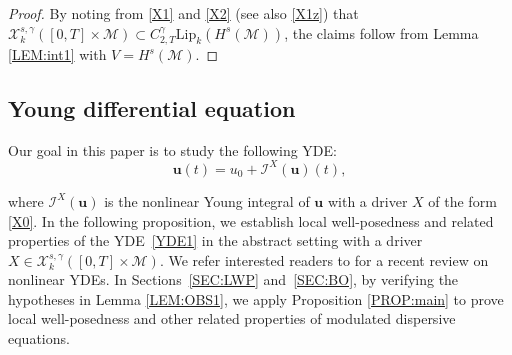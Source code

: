 \documentclass[letterpaper, 11pt,  reqno]{amsart}
\newcommand{\1}{\hspace{0.5mm}\text{I}\hspace{0.5mm}}
\newcommand{\I}{\mathcal{I}}
\newcommand{\noi}{\noindent}
\newcommand{\g}{\gamma}
\newcommand{\M}{\mathcal{M}}
\newcommand{\cX}{\mathcal{X}}
\newcommand{\Lip}{\mathrm{Lip}}
\newcommand{\uu}{\mathbf{u}}
\numberwithin{equation}{section}
\numberwithin{theorem}{section}
\begin{document}
\begin{proof}
 By noting from \eqref{X1} and \eqref{X2} 
 (see also \eqref{X1z}) that
$\cX^{s, \g}_k([0, T]\times \M) \subset  C^\g_{2, T}\Lip_k(H^s(\M))$, 
the claims follow from Lemma \ref{LEM:int1} with $V = H^s(\M)$.
\end{proof}


 









\subsection{Young differential equation}
\label{SUBSEC:Y3}



Our goal in this paper is to 
 study the 
following YDE:
\begin{equation}
\label{YDE1}
\uu(t) = u_0 + \I^X(\uu)(t), 
\end{equation}



\noi
where $\I^X(\uu)$ is the nonlinear Young integral of 
$\uu$ with a driver $X$  of the form \eqref{X0}.
In the following proposition, 
we establish local well-posedness
and related properties
of 
the YDE~\eqref{YDE1} in the abstract setting  with a driver $X\in \cX^{s, \g}_k([0, T] \times \M)$. 
We refer interested readers
 to \cite{G23} for a recent review on
nonlinear YDEs.
In Sections~\ref{SEC:LWP}
and~\ref{SEC:BO}, 
by verifying the hypotheses
in Lemma \ref{LEM:OBS1}, 
we apply Proposition \ref{PROP:main}
to prove local well-posedness
and other related properties
of modulated dispersive equations.
\end{document}
